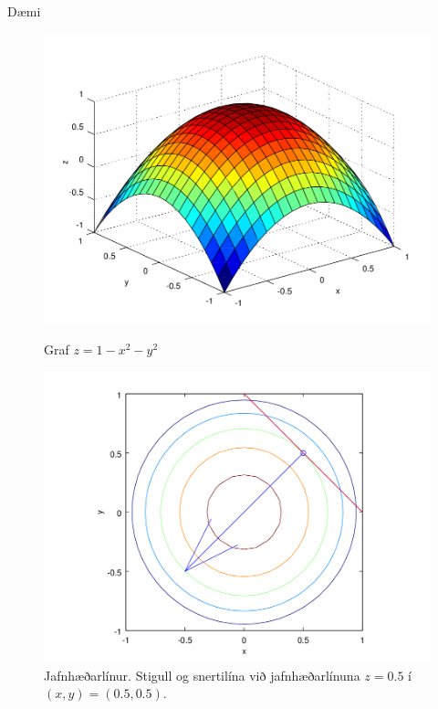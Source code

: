 \begin {frame}{Dæmi}
 \begin{figure}[!h]
        \centering
        \begin{minipage}{.5\textwidth}
            \centering
            \includegraphics[width=1\linewidth]{gradfurf.png}
            \caption*{Graf $z=1-x^2-y^2$}
        \end{minipage}%
        \begin{minipage}{.5\textwidth}
            \centering
            \includegraphics[width=1\linewidth]{gradient.png}
            \caption*{Jafnhæðarlínur.  Stigull og snertilína við jafnhæðarlínuna $z=0.5$ í $(x,y) = (0.5,0.5)$.}
        \end{minipage}
    \end{figure}
 
\end {frame}




